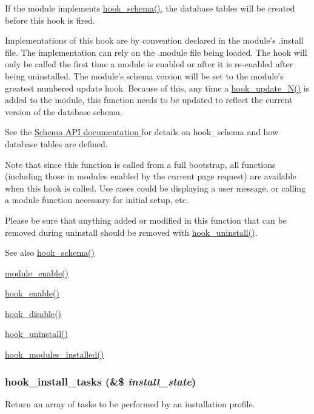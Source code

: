 If the module implements \hyperlink{group__schemaapi_ga9abd926ddaf68a22e6dca28a25d0c6f5}{hook\_\-schema()}, the database tables will be created before this hook is fired.

Implementations of this hook are by convention declared in the module's .install file. The implementation can rely on the .module file being loaded. The hook will only be called the first time a module is enabled or after it is re-\/enabled after being uninstalled. The module's schema version will be set to the module's greatest numbered update hook. Because of this, any time a \hyperlink{group__hooks_ga908950689e6b85cd0fae3b780d69a41f}{hook\_\-update\_\-N()} is added to the module, this function needs to be updated to reflect the current version of the database schema.

See the \hyperlink{}{Schema API documentation } for details on hook\_\-schema and how database tables are defined.

Note that since this function is called from a full bootstrap, all functions (including those in modules enabled by the current page request) are available when this hook is called. Use cases could be displaying a user message, or calling a module function necessary for initial setup, etc.

Please be sure that anything added or modified in this function that can be removed during uninstall should be removed with \hyperlink{group__hooks_ga3fb24f6923b3e585d6326ff5abdcc57c}{hook\_\-uninstall()}.

\begin{DoxySeeAlso}{See also}
\hyperlink{group__schemaapi_ga9abd926ddaf68a22e6dca28a25d0c6f5}{hook\_\-schema()} 

\hyperlink{module_8inc_a4b2c9ea60d7c88595eaebfc4abd5f1bf}{module\_\-enable()} 

\hyperlink{group__hooks_gaedcfb58c08d5c5f8ffcd1059ceeb39e4}{hook\_\-enable()} 

\hyperlink{group__hooks_ga5872573d2180aa4b306e7d6c08a74c10}{hook\_\-disable()} 

\hyperlink{group__hooks_ga3fb24f6923b3e585d6326ff5abdcc57c}{hook\_\-uninstall()} 

\hyperlink{group__hooks_ga71b7268520567cac1a2f296c205e5227}{hook\_\-modules\_\-installed()} 
\end{DoxySeeAlso}
\hypertarget{group__hooks_gafcb418f1e1f7c8acb94ffa12d6bef79f}{
\subsubsection[{hook\_\-install\_\-tasks}]{\setlength{\rightskip}{0pt plus 5cm}hook\_\-install\_\-tasks (\&\$ {\em install\_\-state})}}
\label{group__hooks_gafcb418f1e1f7c8acb94ffa12d6bef79f}
Return an array of tasks to be performed by an installation profile.

